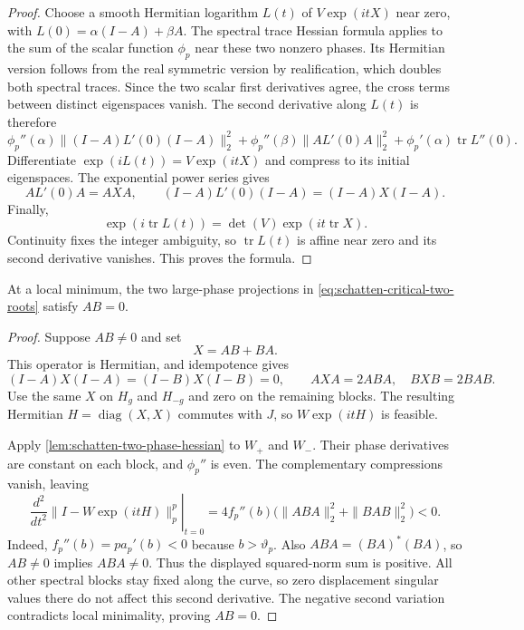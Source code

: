 \begin{proof}
Choose a smooth Hermitian logarithm $L(t)$ of $V\exp(itX)$ near zero,
with $L(0)=\alpha(I-A)+\beta A$. The spectral trace Hessian formula
\citep[Theorem~3.3]{lewis2001twice} applies to the sum of the scalar
function $\phi_p$ near these two nonzero phases. Its Hermitian version
follows from the real symmetric version by realification, which doubles
both spectral traces. Since the two scalar first derivatives agree, the
cross terms between distinct eigenspaces vanish. The second derivative
along $L(t)$ is therefore
\[
 \phi_p''(\alpha)\|(I-A)L'(0)(I-A)\|_2^2
 +\phi_p''(\beta)\|AL'(0)A\|_2^2
 +\phi_p'(\alpha)\operatorname{tr}L''(0).
\]
Differentiate $\exp(iL(t))=V\exp(itX)$ and compress to its initial
eigenspaces. The exponential power series gives
\[
 AL'(0)A=AXA,\qquad
 (I-A)L'(0)(I-A)=(I-A)X(I-A).
\]
Finally,
\[
 \exp(i\operatorname{tr}L(t))=\det(V)\exp(it\operatorname{tr}X).
\]
Continuity fixes the integer ambiguity, so $\operatorname{tr}L(t)$ is
affine near zero and its second derivative vanishes. This proves the
formula.
\end{proof}

\begin{proposition}
\label{prop:schatten-no-mixing}
At a local minimum, the two large-phase projections in
\cref{eq:schatten-critical-two-roots} satisfy $AB=0$.
\end{proposition}

\begin{proof}
Suppose $AB\ne0$ and set
\begin{equation}
 X=AB+BA.
 \label{eq:schatten-mixing-direction}
\end{equation}
This operator is Hermitian, and idempotence gives
\[
 (I-A)X(I-A)=(I-B)X(I-B)=0,\qquad
 AXA=2ABA,\quad BXB=2BAB.
\]
Use the same $X$ on $H_g$ and $H_{-g}$ and zero on the remaining
blocks. The resulting Hermitian $H=\operatorname{diag}(X,X)$ commutes
with $J$, so $W\exp(itH)$ is feasible.

Apply \cref{lem:schatten-two-phase-hessian} to $W_+$ and $W_-$.
Their phase derivatives are constant on each block, and $\phi_p''$ is
even. The complementary compressions vanish, leaving
\begin{equation}
 \left.\frac{d^2}{dt^2}\|I-W\exp(itH)\|_p^p\right|_{t=0}
     =4f_p''(b)\bigl(\|ABA\|_2^2+\|BAB\|_2^2\bigr)<0.
 \label{eq:schatten-mixing-negative-curvature}
\end{equation}
Indeed, $f_p''(b)=p a_p'(b)<0$ because $b>\vartheta_p$.
Also $ABA=(BA)^*(BA)$, so $AB\ne0$ implies $ABA\ne0$.
Thus the displayed squared-norm sum is positive. All other spectral
blocks stay fixed along the curve, so zero displacement singular values
there do not affect this second derivative. The negative second variation
contradicts local minimality, proving $AB=0$.
\end{proof}

